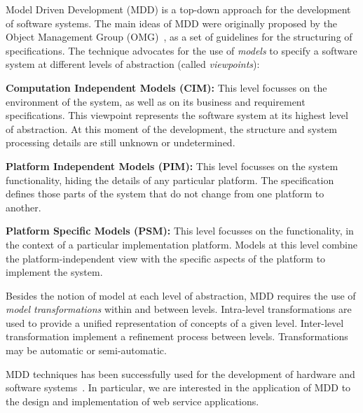 
Model Driven Development (MDD) is a top-down approach for the development of software systems. 
The main ideas of MDD were originally proposed by the Object Management Group (OMG)~\cite{mda}, as a set of guidelines for the structuring of specifications.
The technique advocates for the use of \textit{models} to specify a software system at different levels of abstraction (called \textit{viewpoints}):

\begin{trivlist}
\item \textbf{Computation Independent Models (CIM):} This level focusses on the
environment of the system, as well as on its business and requirement specifications. 
This viewpoint represents the software system at its highest level of abstraction. 
At this moment of the development, the structure and system processing details are still unknown or undetermined. 
 
\item \textbf{Platform Independent Models (PIM):} This level focusses on the system functionality, hiding the details of any particular platform. 
The specification defines those parts of the system that do not change from one platform to another. 

\item \textbf{Platform Specific Models (PSM):} This level focusses on the functionality, in the context of a particular implementation platform.
Models at this level combine the platform-independent view with the specific aspects of the platform to implement the system.  
\end{trivlist}

Besides the notion of model at each level of abstraction, MDD requires the use of \textit{model transformations} within and between levels.
Intra-level transformations are used to provide a unified representation of concepts of a given level.
Inter-level transformation implement a refinement process between levels.
Transformations may be automatic or semi-automatic.

MDD techniques has been successfully used for the development of hardware and software systems~\cite{MDDvariosAqui}. 
In particular, we are interested in the application of MDD to the design and implementation of web service applications.

